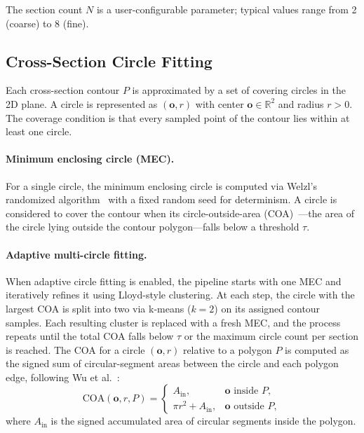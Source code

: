 The section count $N$ is a user-configurable parameter; typical values range from 2 (coarse) to 8 (fine).

\subsection{Cross-Section Circle Fitting}

Each cross-section contour $P$ is approximated by a set of covering circles in the 2D plane.
A circle is represented as $( \mathbf{o}, r )$ with center $\mathbf{o} \in \mathbb{R}^2$ and radius $r > 0$.
The coverage condition is that every sampled point of the contour lies within at least one circle.

\paragraph{Minimum enclosing circle (MEC).}
For a single circle, the minimum enclosing circle is computed via Welzl's randomized algorithm~\cite{welzl1991mec} with a fixed random seed for determinism.
A circle is considered to cover the contour when its circle-outside-area (COA)~\cite{wu2018capsule}---the area of the circle lying outside the contour polygon---falls below a threshold $\tau$.

\paragraph{Adaptive multi-circle fitting.}
When adaptive circle fitting is enabled, the pipeline starts with one MEC and iteratively refines it using Lloyd-style clustering.
At each step, the circle with the largest COA is split into two via k-means ($k = 2$) on its assigned contour samples.
Each resulting cluster is replaced with a fresh MEC, and the process repeats until the total COA falls below $\tau$ or the maximum circle count per section is reached.
The COA for a circle $(\mathbf{o}, r)$ relative to a polygon $P$ is computed as the signed sum of circular-segment areas between the circle and each polygon edge, following Wu et al.~\cite{wu2018capsule}:
\begin{equation}
\mathrm{COA}(\mathbf{o}, r, P) = \begin{cases}
A_{\mathrm{in}}, & \mathbf{o} \text{ inside } P, \\
\pi r^2 + A_{\mathrm{in}}, & \mathbf{o} \text{ outside } P,
\end{cases}
\label{eq:coa}
\end{equation}
where $A_{\mathrm{in}}$ is the signed accumulated area of circular segments inside the polygon.

